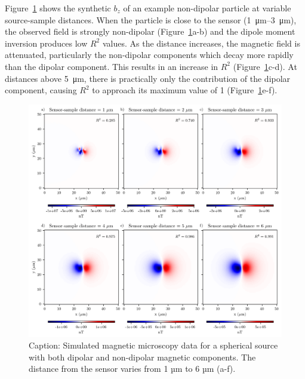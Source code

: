 Figure~\ref{non-dipolarity-synthetic-data} shows the synthetic $b_z$ of an example non-dipolar particle at variable source-sample distances.
When the particle is close to the sensor (\qtyrange{1}{3}{\um}), the observed field is strongly non-dipolar (Figure~\ref{non-dipolarity-synthetic-data}a-b) and the dipole moment inversion produces low $R^2$ values.
As the distance increases, the magnetic field is attenuated, particularly the non-dipolar components which decay more rapidly than the dipolar component.
This results in an increase in $R^2$ (Figure~\ref{non-dipolarity-synthetic-data}c-d).
At distances above \qty{5}{\um}, there is practically only the contribution of the dipolar component, causing $R^2$ to approach its maximum value of 1 (Figure~\ref{non-dipolarity-synthetic-data}e-f).

\begin{figure}[tb!]
  \centering
  \includegraphics[width=1\linewidth]{figures/non-dipolarity-synthetic.png}
  \caption{Caption: Simulated magnetic microscopy data for a spherical source with both dipolar and non-dipolar magnetic components. The distance from the sensor varies from 1 µm to 6 µm (a-f).}
  \label{non-dipolarity-synthetic-data}
\end{figure}

